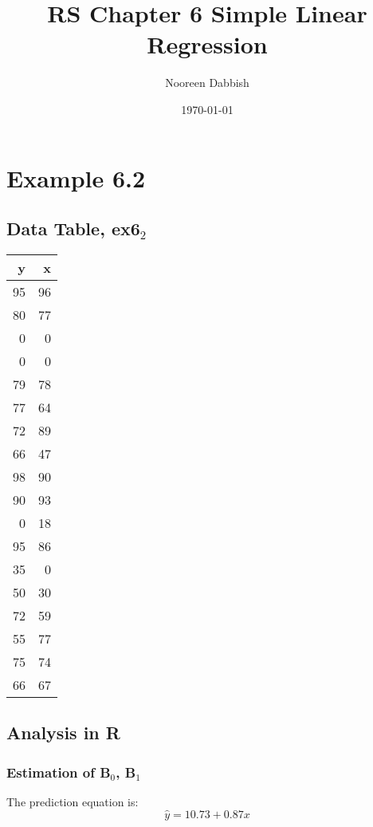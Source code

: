 \documentclass[11pt]{article}
\title{RS Chapter 6 Simple Linear Regression}
\author{Nooreen Dabbish}
\date{\today}
\begin{document}
\maketitle

\setcounter{tocdepth}{3}
\tableofcontents
\vspace*{1cm}

\section{Example 6.2}
\label{sec-1}
\subsection{Data Table, ex6$_2$}
\label{sec-1-1}


\begin{center}
\begin{tabular}{rr}
  y  &   x  \\
\hline
 95  &  96  \\
 80  &  77  \\
  0  &   0  \\
  0  &   0  \\
 79  &  78  \\
 77  &  64  \\
 72  &  89  \\
 66  &  47  \\
 98  &  90  \\
 90  &  93  \\
  0  &  18  \\
 95  &  86  \\
 35  &   0  \\
 50  &  30  \\
 72  &  59  \\
 55  &  77  \\
 75  &  74  \\
 66  &  67  \\
\end{tabular}
\end{center}
\subsection{Analysis in R}
\label{sec-1-2}
\subsubsection{Estimation of B$_0$, B$_1$}
\label{sec-1-2-1}



The prediction equation is: $$\hat{y} = 10.73 +
0.87
 x$$
\end{document}
